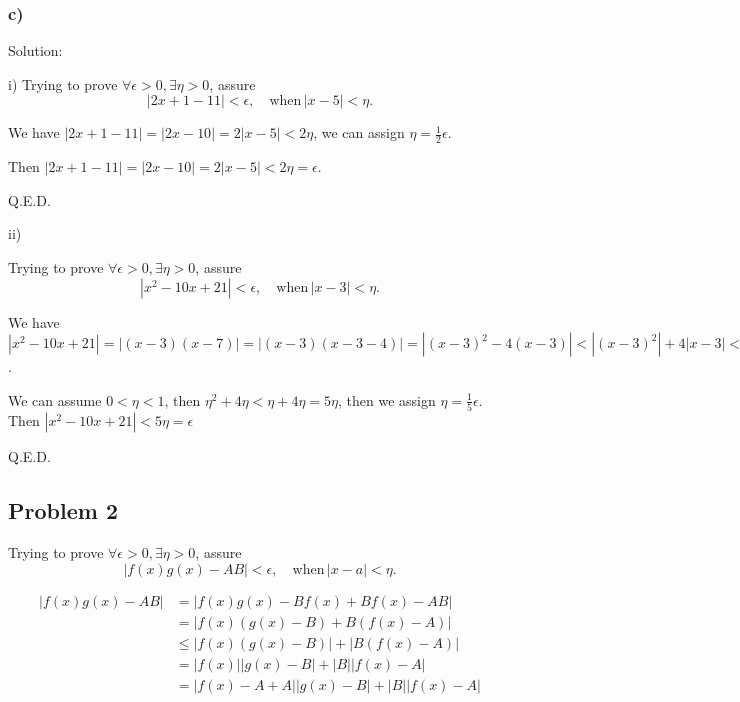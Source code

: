 \documentclass[letterpaper, 11pt]{article}
\newcommand{\1}{\mathds{1}}	%
\theoremstyle{definition}
\begin{document}
  \subsubsection*{c)}

  Solution:

  i)
  Trying to prove $ \forall \epsilon > 0, \exists \eta > 0$, assure \begin{equation*}
    |2x+1-11| < \epsilon,\quad \text{when}\, |x - 5| < \eta.
  \end{equation*}

  We have $|2x+1-11| = |2x-10|=2|x-5| < 2 \eta $,
  we can assign $\eta = \frac{1}{2} \epsilon$.

  Then $|2x+1-11| = |2x-10|=2|x-5| < 2 \eta = \epsilon$.

  Q.E.D.

  ii)

  Trying to prove $ \forall \epsilon > 0, \exists \eta > 0$, assure \begin{equation*}
    |x^{2} - 10x + 21| < \epsilon,\quad \text{when}\, |x - 3| < \eta.
  \end{equation*}

  We have $|x^{2} - 10x + 21| = |(x-3)(x-7)|=|(x-3)(x-3-4)| = |(x-3)^{2} - 4(x-3)| < |(x-3)^{2}| + 4 |x-3| < \eta ^{2} + 4 \eta $.

  We can assume $0 < \eta < 1$, then $\eta ^{2} + 4 \eta < \eta + 4\eta = 5\eta$, then we assign $\eta = \frac{1}{5}\epsilon$.
  Then $|x^{2} - 10x + 21| < 5\eta = \epsilon$

  Q.E.D.

  \subsection*{Problem 2}
  Trying to prove $ \forall \epsilon > 0, \exists \eta > 0$, assure \begin{equation*}
    |f(x)g(x) - AB| < \epsilon,\quad \text{when}\, |x-a| < \eta.
  \end{equation*}

  \begin{align*}
    |f(x)g(x) - AB| & = |f(x)g(x) - B f(x) + B f(x) - AB|    \\
                    & =|f(x)(g(x)-B) + B(f(x)-A)|            \\
                    & \leq |f(x)(g(x)- B)| + |B(f(x)-A)|     \\
                    & = |f(x)||g(x)- B| + |B||f(x)-A|        \\
                    & = |f(x)-A + A||g(x)-B| + |B||f(x) - A| \\
  \end{align*}
\end{document}
